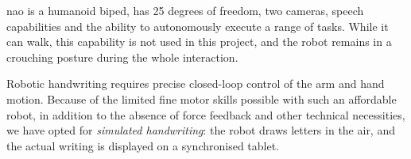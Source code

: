 \documentclass{article}
\begin{document}
{\sc nao} is a humanoid biped, has 25 degrees of freedom,
two cameras, speech capabilities and the ability to autonomously execute a range
of tasks. While it can walk, this capability is not used in this project, and
the robot remains in a crouching posture during the whole interaction.

Robotic handwriting requires precise closed-loop control of the arm and hand
motion. Because of the limited fine motor skills possible
with such an affordable robot, in addition to the absence of force feedback and
other technical necessities, we have opted for \emph{simulated
handwriting}: the robot draws letters in the air, and the actual writing is
displayed on a synchronised tablet.

\begin{figure}[ht!]
\centering

\end{figure}
\end{document}
